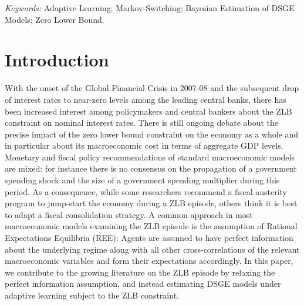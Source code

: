 \documentclass[12pt,reqno]{article}
\numberwithin{equation}{section}
\begin{document}
\noindent
\textit{Keywords:} Adaptive Learning; Markov-Switching; Bayesian Estimation of DSGE Models; Zero Lower Bound. 

\newpage

\section{Introduction}

With the onset of the Global Financial Crisis in 2007-08 and the subsequent drop of interest rates to near-zero levels among the leading central banks, there has been increased interest among policymakers and central bankers about the ZLB constraint on nominal interest rates. There is still ongoing debate about the precise impact of the zero lower bound constraint on the economy as a whole and in particular about its macroeconomic cost in terms of aggregate GDP levels. Monetary and fiscal policy recommendations of standard macroeconomic models are mixed: for instance there is no consensus on the propagation of a government spending shock and the size of a government spending multiplier during this period. As a consequence, while some researchers recommend a fiscal austerity program to jump-start the economy during a ZLB episode, others think it is best to adapt a fiscal consolidation strategy. A common approach in most macroeconomic models examining the ZLB episode is the assumption of Rational Expectations Equilibria (REE): Agents are assumed to have perfect information about the underlying regime along with all other cross-correlations of the relevant macroeconomic variables and form their expectations accordingly. In this paper, we contribute to the growing literature on the ZLB episode by relaxing the perfect information assumption, and instead estimating DSGE models under adaptive learning subject to the ZLB constraint. \\
\end{document}
